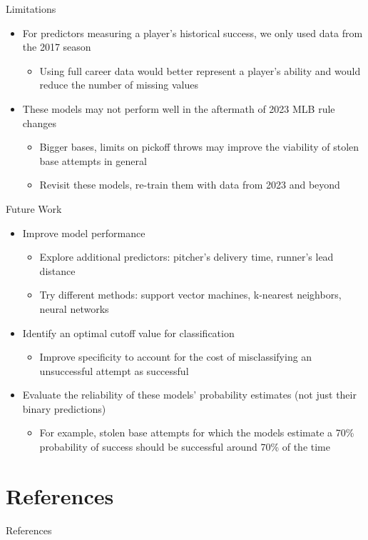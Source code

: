 \documentclass[10pt]{beamer}
\begin{document}
\begin{frame}{Limitations}
\begin{itemize}
    \item For predictors measuring a player's historical success, we only used data from the 2017 season
    \begin{itemize}
        \item Using full career data would better represent a player's ability and would reduce the number of missing values
    \end{itemize}
\vspace{3mm}
    \item These models may not perform well in the aftermath of 2023 MLB rule changes
    \begin{itemize}
        \item Bigger bases, limits on pickoff throws may improve the viability of stolen base attempts in general

        \item Revisit these models, re-train them with data from 2023 and beyond
    \end{itemize}
\end{itemize}
\end{frame}

\begin{frame}{Future Work}
\begin{itemize}
    \item Improve model performance
    \begin{itemize}
        \item Explore additional predictors: pitcher's delivery time, runner's lead distance

        \item Try different methods: support vector machines, k-nearest neighbors, neural networks
    \end{itemize}
    \vspace{2mm}
    \item Identify an optimal cutoff value for classification
    \begin{itemize}
        \item Improve specificity to account for the cost of misclassifying an unsuccessful attempt as successful
    \end{itemize}
    \vspace{2mm}
    \item Evaluate the reliability of these models' probability estimates (not just their binary predictions)
    \begin{itemize}
        \item For example, stolen base attempts for which the models estimate a 70\% probability of success should be successful around 70\% of the time
    \end{itemize}
\end{itemize}
\end{frame}



\section{References}
\begin{frame}[allowframebreaks]{References}
    \nocite{*}
    
\end{frame}
\end{document}
